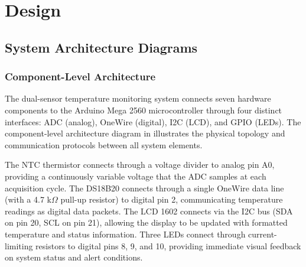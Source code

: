 \section{Design}

\subsection{System Architecture Diagrams}

\subsubsection{Component-Level Architecture}

The dual-sensor temperature monitoring system connects seven hardware components to the Arduino Mega 2560 microcontroller through four distinct interfaces: ADC (analog), OneWire (digital), I2C (LCD), and GPIO (LEDs). The component-level architecture diagram in  illustrates the physical topology and communication protocols between all system elements.

The NTC thermistor connects through a voltage divider to analog pin A0, providing a continuously variable voltage that the ADC samples at each acquisition cycle. The DS18B20 connects through a single OneWire data line (with a 4.7 k$\Omega$ pull-up resistor) to digital pin 2, communicating temperature readings as digital data packets. The LCD 1602 connects via the I2C bus (SDA on pin 20, SCL on pin 21), allowing the display to be updated with formatted temperature and status information. Three LEDs connect through current-limiting resistors to digital pins 8, 9, and 10, providing immediate visual feedback on system status and alert conditions.

